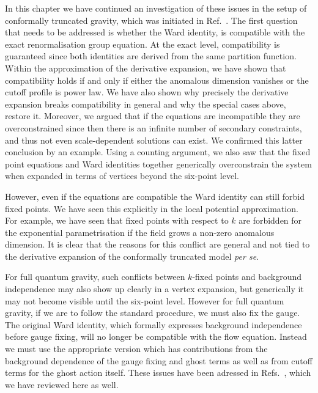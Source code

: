 \documentclass[11pt]{book}
\numberwithin{equation}{chapter}
\begin{document}
In this chapter we have continued an investigation of these issues
in the setup of conformally truncated gravity, which was initiated in Ref.~\cite{Dietz:2015owa}.
The first question that needs to be addressed is whether the Ward identity,
is compatible with the exact renormalisation group equation.
At the exact level, compatibility is guaranteed since both identities
are derived from the same partition function.
Within the approximation of the derivative expansion,
we have shown that compatibility holds if and only if either the anomalous
dimension vanishes or the cutoff profile is power law.
We have also shown why precisely the derivative expansion breaks compatibility
in general and why the special cases above, restore it.
Moreover, we argued that if the equations are incompatible they are overconstrained
since then there is an infinite number of secondary constraints,
and thus not even scale-dependent solutions can exist.
We confirmed this latter conclusion by an example.
Using a counting argument, we also saw that the fixed point equations and Ward identities together
generically overconstrain the system when expanded in terms of vertices beyond the six-point level.

However, even if the equations are compatible the Ward identity can still forbid fixed points.
We have seen this explicitly in the local potential approximation.
For example, we have seen that fixed points with respect to $k$ are forbidden
for the exponential parametrisation if the field grows a non-zero anomalous dimension.
It is clear that the reasons for this conflict are general and not tied to the derivative expansion
of the conformally truncated model \textit{per se}.

For full quantum gravity, such conflicts between $k$-fixed points and
background independence may also show up clearly in a vertex expansion,
but generically it may not become visible until the six-point level.
However for full quantum gravity, if we are to follow the standard procedure, we must also fix the gauge.
The original Ward identity, which formally expresses background independence before gauge fixing,
will no longer be compatible with the flow equation.
Instead we must use the appropriate version which has contributions from the background dependence of
the gauge fixing and ghost terms as well as from cutoff terms for the ghost action itself.
These issues have been adressed in
Refs.~\cite{Morris:2016spn, Percacci:2016arh},
which we have reviewed here as well.
\end{document}
